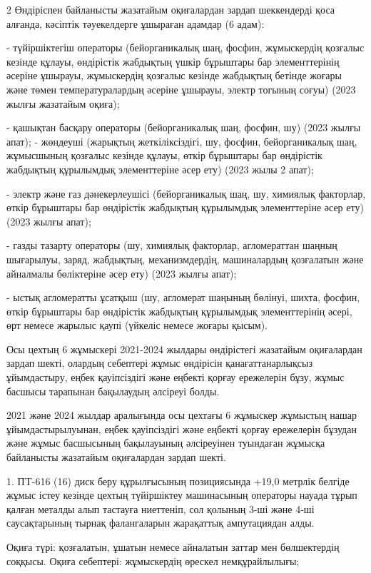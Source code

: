 \begin{multicols}{2}
Өндіріспен байланысты жазатайым оқиғалардан зардап шеккендерді қоса
алғанда, кәсіптік тәуекелдерге ұшыраған адамдар (6 адам):

- түйіршіктегіш операторы (бейорганикалық шаң, фосфин, жұмыскердің
қозғалыс кезінде құлауы, өндірістік жабдықтың үшкір бұрыштары бар
элементтерінің әсеріне ұшырауы, жұмыскердің қозғалыс кезінде жабдықтың
бетінде жоғары және төмен температуралардың әсеріне ұшырауы, электр
тогының соғуы) (2023 жылғы жазатайым оқиға);

- қашықтан басқару операторы (бейорганикалық шаң, фосфин, шу) (2023
жылғы апат); - жөндеуші (жарықтың жеткіліксіздігі, шу, фосфин,
бейорганикалық шаң, жұмысшының қозғалыс кезінде құлауы, өткір бұрыштары
бар өндірістік жабдықтың құрылымдық элементтеріне әсер ету) (2023 жылы 2
апат);

- электр және газ дәнекерлеушісі (бейорганикалық шаң, шу, химиялық
факторлар, өткір бұрыштары бар өндірістік жабдықтың құрылымдық
элементтеріне әсер ету) (2023 жылғы апат);

- газды тазарту операторы (шу, химиялық факторлар, агломераттан шаңның
шығарылуы, заряд, жабдықтың, механизмдердің, машиналардың қозғалатын
және айналмалы бөліктеріне әсер ету) (2023 жылғы апат);

- ыстық агломератты ұсатқыш (шу, агломерат шаңының бөлінуі, шихта,
фосфин, өткір бұрыштары бар өндірістік жабдықтың құрылымдық
элементтерінің әсері, өрт немесе жарылыс қаупі (үйкеліс немесе жоғары
қысым).

Осы цехтың 6 жұмыскері 2021-2024 жылдары өндірістегі жазатайым
оқиғалардан зардап шекті, олардың себептері жұмыс өндірісін
қанағаттанарлықсыз ұйымдастыру, еңбек қауіпсіздігі және еңбекті қорғау
ережелерін бұзу, жұмыс басшысы тарапынан бақылаудың әлсіреуі болды.

2021 және 2024 жылдар аралығында осы цехтағы 6 жұмыскер жұмыстың нашар
ұйымдастырылуынан, еңбек қауіпсіздігі және еңбекті қорғау ережелерін
бұзудан және жұмыс басшысының бақылауының әлсіреуінен туындаған жұмысқа
байланысты жазатайым оқиғалардан зардап шекті.

1. ПT-616 (16) диск беру құрылғысының позициясында +19,0 метрлік белгіде
жұмыс істеу кезінде цехтың түйіршіктеу машинасының операторы науада
тұрып қалған металды алып тастауға ниеттеніп, сол қолының 3-ші және 4-ші
саусақтарының тырнақ фалангаларын жарақаттық ампутациядан алды.

Оқиға түрі: қозғалатын, ұшатын немесе айналатын заттар мен бөлшектердің
соққысы. Оқиға себептері: жұмыскердің өрескел немқұрайлылығы;


\end{multicols}
